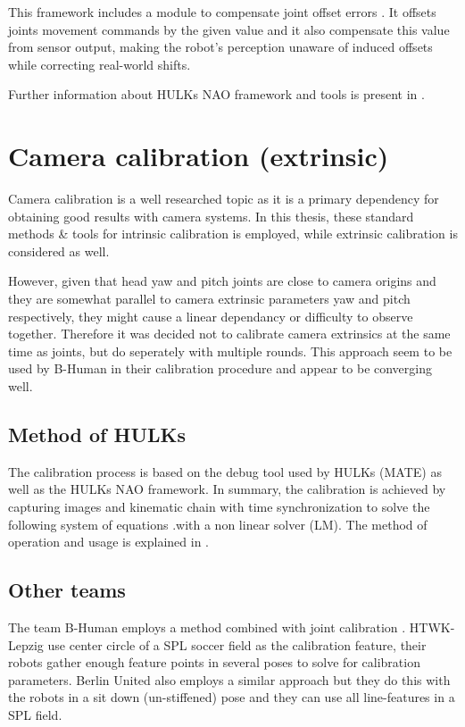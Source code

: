 \documentclass[english, printversion, nomenclature, notitle]{tuvisionthesis} %
\begin{document}
This framework includes a module to compensate joint offset errors . It offsets joints movement commands by the given value and it also compensate this value from sensor output, making the robot's perception unaware of induced offsets while correcting real-world shifts. 

Further information about HULKs NAO framework and tools is present in \cite{darshana_adikari_team_2017}.

\section{Camera calibration (extrinsic)}

Camera calibration is a well researched topic as it is a primary dependency for obtaining good results with camera systems. In this thesis, these standard methods \& tools for intrinsic calibration is employed, while extrinsic calibration is considered as well.

However, given that head yaw and pitch joints are close to camera origins and they are somewhat parallel to camera extrinsic parameters yaw and pitch respectively, they might cause a linear dependancy or difficulty to observe together. Therefore it was decided not to calibrate camera extrinsics at the same time as joints, but do seperately with multiple rounds. This approach seem to be used by B-Human in their calibration procedure \cite{thomas_rofer_b-human_2018} and appear to be converging well. 

\subsection{Method of HULKs}

The calibration process is based on the debug tool used by HULKs (MATE) as well as the HULKs NAO framework. In summary, the calibration is achieved by capturing images and kinematic chain with time synchronization to solve the following system of equations .with a non linear solver (LM). The method of operation and usage is explained in \cite{darshana_adikari_team_2017}.

\subsection{Other teams}
The team B-Human employs a method combined with joint calibration \cite{thomas_rofer_b-human_2018}. HTWK-Lepzig use center circle of a SPL soccer field as the calibration feature, their robots gather enough feature points in several poses to solve for calibration parameters. Berlin United also employs a similar approach but they do this with the robots in a sit down (un-stiffened) pose and they can use all line-features in a SPL field. 
\end{document}
